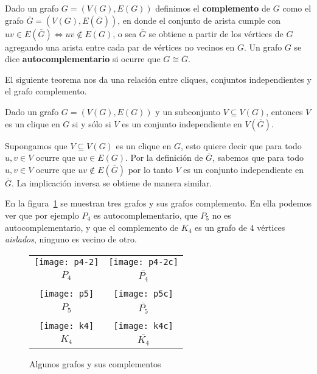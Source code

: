 \begin{definicion}
Dado un grafo $G=(V(G),E(G))$ definimos el {\bf complemento} de $G$ como el grafo $\overline{G}=(V(G),E(\overline{G}))$, en donde el conjunto de arista cumple con $uv\in E(\overline G)\Leftrightarrow uv\notin E(G)$,
o sea $\overline G$ se obtiene a partir de los vértices de $G$ agregando una arista entre cada par de vértices no vecinos en $G$.
Un grafo $G$ se dice {\bf autocomplementario} si ocurre que $G\cong\overline G$.
\end{definicion}

El siguiente teorema nos da una relación entre cliques, conjuntos independientes y el grafo complemento.

\begin{teorema}
\label{teo:clique-indep}
Dado un grafo $G=(V(G),E(G))$ y un subconjunto $V\subseteq V(G)$, entonces $V$ es un clique en $G$ si y sólo si $V$ es un conjunto independiente en $V(\overline G)$.

\begin{demostracion}
Supongamos que $V\subseteq V(G)$ es un clique en $G$, esto quiere decir que para todo $u,v\in V$ ocurre que $uv\in E(G)$.
Por la definición de $\overline G$, sabemos que para todo $u,v\in V$ ocurre que $uv\notin E(\overline G)$ por lo tanto $V$ es un conjunto independiente en $\overline G$.
La implicación inversa se obtiene de manera similar.
\end{demostracion}
\end{teorema}

\begin{ejemplo}
En la figura~\ref{fig:complementos} se muestran tres grafos y sus grafos complemento.
En ella podemos ver que por ejemplo $P_4$ es autocomplementario, que $P_5$ no es autocomplementario, y que el complemento de $K_4$ es un grafo de $4$ vértices \emph{aislados}, ninguno es vecino de otro.
\begin{figure}[h!]
\centering
\begin{tabular}{cc}
\texttt{[image: p4-2]}\hspace*{3em} &  \texttt{[image: p4-2c]} \\
$P_4$\hspace*{3em} & $\overline{P_4}$ \\
& \\
\texttt{[image: p5]}\hspace*{3em} &  \texttt{[image: p5c]} \\
$P_5$\hspace*{3em} & $\overline{P_5}$ \\
& \\
\texttt{[image: k4]}\hspace*{3em} &  \texttt{[image: k4c]} \\
$K_4$\hspace*{3em} & $\overline{K_4}$
\end{tabular}
\caption{Algunos grafos y sus complementos}
\label{fig:complementos}
\end{figure}
\end{ejemplo}


